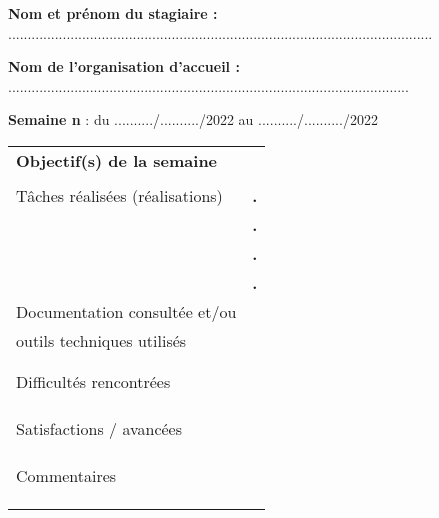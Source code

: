 \documentclass[a4paper,11pt]{article}
\makeatletter
\newcommand{\mktitle}{\@maketitle}
\makeatother
\begin{document}
\mktitle\vspace{-.2cm}

\noindent\textbf{Nom et prénom du stagiaire :} .............................................................................................................\vspace{.4cm}

\noindent\textbf{Nom de l'organisation d'accueil :} .......................................................................................................\vspace{.4cm}

\noindent\textbf{Semaine n} : du ........../........../2022 au ........../........../2022\vspace{-.2cm}

\begin{center}
\begin{tabular}{|C{6cm}|p{10.3cm}|}
	\hline
	\textbf{Objectif(s) de la semaine} &\\&\\
	\hline
	Tâches réalisées (réalisations) & \hspace{.2cm}\huge\textbf{.}\\&\hspace{.2cm}\huge\textbf{.}\\&\hspace{.2cm}\huge\textbf{.}\\& \hspace{.2cm}\huge\textbf{.}\\
	\hline
	Documentation consultée et/ou &\\
	outils techniques utilisés &\\&\\&\\
	\hline
	Difficultés rencontrées &\\&\\&\\&\\
	\hline
	Satisfactions / avancées &\\&\\&\\&\\
	\hline
	Commentaires &\\&\\&\\&\\
	\hline
\end{tabular}\vspace{.35cm}
\begin{tabular}{|C{6cm}|p{10.3cm}|}

\end{tabular}
\end{center}
\end{document}
